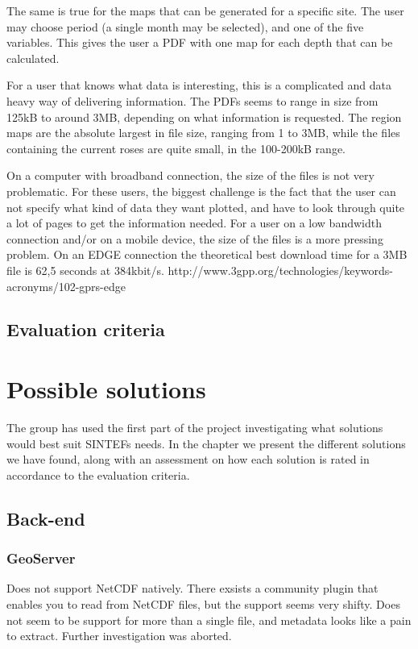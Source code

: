 \documentclass[11pt,a4paper,titlepage,oneside]{report}
\begin{document}
The same is true for the maps that can be generated for a specific site. The user may choose period (a single month may be selected), and one of the five variables. This gives the user a PDF with one map for each depth that can be calculated. 

For a user that knows what data is interesting, this is a complicated and data heavy way of delivering information. The PDFs seems to range in size from 125kB to around 3MB, depending on what information is requested. The region maps are the absolute largest in file size, ranging from 1 to 3MB, while the files containing the current roses are quite small, in the 100-200kB range. 

On a computer with broadband connection, the size of the files is not very problematic. For these users, the biggest challenge is the fact that the user can not specify what kind of data they want plotted, and have to look through quite a lot of pages to get the information needed. For a user on a low bandwidth connection and/or on a mobile device, the size of the files is a more pressing problem. On an EDGE connection the theoretical best download time for a 3MB file is 62,5 seconds at 384kbit/s.
http://www.3gpp.org/technologies/keywords-acronyms/102-gprs-edge

\section{Evaluation criteria}

\chapter{Possible solutions}
The group has used the first part of the project investigating what solutions would best suit SINTEFs needs. In the chapter we present the different solutions we have found, along with an assessment on how each solution is rated in accordance to the evaluation criteria. 

\section{Back-end}
\subsection{GeoServer}

Does not support NetCDF natively. There exsists a community plugin that enables you to read from NetCDF files, but the support seems very shifty. Does not seem to be support for more than a single file, and metadata looks like a pain to extract. Further investigation was aborted.
\end{document}
